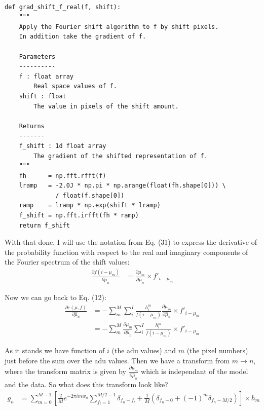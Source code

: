 \documentclass[11pt]{article}
\begin{document}
\begin{verbatim}

def grad_shift_f_real(f, shift):
    """
    Apply the Fourier shift algorithm to f by shift pixels. 
    In addition take the gradient of f.
    
    Parameters
    ----------
    f : float array
        Real space values of f.
    shift : float
        The value in pixels of the shift amount.
            
    Returns
    -------
    f_shift : 1d float array
        The gradient of the shifted representation of f.
    """
    fh      = np.fft.rfft(f)
    lramp   = -2.0J * np.pi * np.arange(float(fh.shape[0])) \
              / float(f.shape[0])
    ramp    = lramp * np.exp(shift * lramp)
    f_shift = np.fft.irfft(fh * ramp)
    return f_shift

\end{verbatim}

With that done, I will use the notation from Eq. (31) to express the derivative of the probability function with respect to the real and imaginary components of the Fourier spectrum of the shift values:
\begin{align}
   \frac{\partial f(i - \mu_m)}{\partial \hat{\mu}_n} &=  \frac{\partial \mu_m}{\partial \hat{\mu}_n} \times f'_{i-\mu_m}
\end{align}


Now we can go back to Eq. (12):
\begin{align}
   \frac{\partial \varepsilon(\mu, f)}{\partial \hat{\mu}_n} &= -\sum_m^M \sum_i^I \frac{h^m_i}{f(i - \mu_m)} \frac{\partial \mu_m}{\partial \hat{\mu}_n} \times f'_{i-\mu_m} \\
   &= -\sum_m^M  \frac{\partial \mu_m}{\partial \hat{\mu}_n} \sum_i^I \frac{h^m_i}{f(i - \mu_m)} \times f'_{i-\mu_m}
   \label{mu_grad}
\end{align}


As it stands we have function of $i$ (the adu values) and $m$ (the pixel numbers) just before the sum over the adu values. Then we have a transform from $m\rightarrow n$, where the transform matrix is given by $\frac{\partial \mu_m}{\partial \hat{\mu}_n}$ which is independant of the model and the data. So what does this transform look like?
\begin{align}
   g_n &= \sum_{m=0}^{M-1} \left[ \frac{2}{M} e^{-2\pi i m w_n} \sum_{f_l=1}^{M/2-1} \delta_{f_n - f_l} + \frac{1}{M}\left(\delta_{f_n - 0} +  (-1)^m \delta_{f_n - M/2} \right) \right] \times h_m
\end{align}
\end{document}

